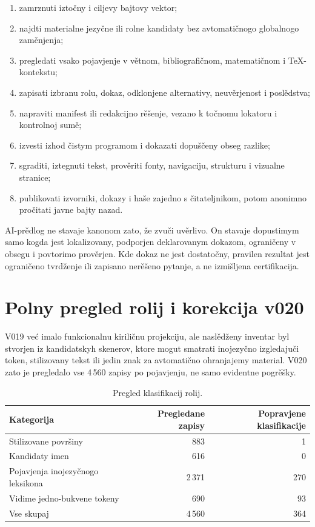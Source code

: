 \documentclass[11pt]{article}
\begin{document}
\begin{enumerate}
\item zamrznuti iztočny i ciljevy bajtovy vektor;
\item najdti materialne jezyčne ili rolne kandidaty bez avtomatičnogo globalnogo zaměnjenja;
\item pregledati vsako pojavjenje v větnom, bibliografičnom, matematičnom i TeX-kontekstu;
\item zapisati izbranu rolu, dokaz, odklonjene alternativy, neuvěrjenost i poslědstva;
\item napraviti manifest ili redakcijno rěšenje, vezano k točnomu lokatoru i kontrolnoj sumě;
\item izvesti izhod čistym programom i dokazati dopuščeny obseg razlike;
\item sgraditi, iztegnuti tekst, prověriti fonty, navigaciju, strukturu i vizualne stranice;
\item publikovati izvorniki, dokazy i haše zajedno s čitateljnikom, potom anonimno pročitati javne bajty nazad.
\end{enumerate}

AI-prědlog ne stavaje kanonom zato, že zvuči uvěrlivo. On stavaje dopustimym samo kogda jest lokalizovany, podporjen deklarovanym dokazom, ograničeny v obsegu i povtorimo prověrjen. Kde dokaz ne jest dostatočny, pravilen rezultat jest ograničeno tvrdženje ili zapisano nerěšeno pytanje, a ne izmišljena certifikacija.

\section{Polny pregled rolij i korekcija v020}

V019 već imalo funkcionalnu kiriličnu projekciju, ale naslědženy inventar byl stvorjen iz kandidatskyh skenerov, ktore mogut smatrati inojezyčno izgledajuči token, stilizovany tekst ili jedin znak za avtomatično ohranjajemy material. V020 zato je pregledalo vse 4\,560 zapisy po pojavjenju, ne samo evidentne pogrěšky.

\begin{table}[ht]
\centering
\caption{Pregled klasifikacij rolij.}\label{tab:isv-review}
\begin{tabular}{@{}lrr@{}}
\toprule
Kategorija & Pregledane zapisy & Popravjene klasifikacije\\
\midrule
Stilizovane površiny & 883 & 1\\
Kandidaty imen & 616 & 0\\
Pojavjenja inojezyčnogo leksikona & 2\,371 & 270\\
Vidime jedno-bukvene tokeny & 690 & 93\\
\midrule
Vse skupaj & 4\,560 & 364\\
\bottomrule
\end{tabular}
\end{table}
\end{document}
